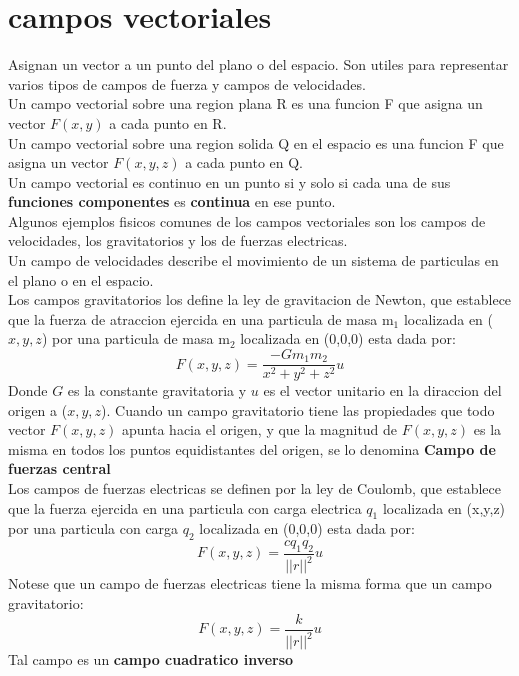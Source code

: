 \documentclass[11pt]{article}
\begin{document}
\section{campos vectoriales}
Asignan un vector a un punto del plano o del espacio. Son utiles para representar varios tipos de campos de fuerza y campos de velocidades.\\
\linebreak
Un campo vectorial sobre una region plana R es una funcion F que asigna un vector $F(x,y)$ a cada punto en R.\\
\linebreak
Un campo vectorial sobre una region solida Q en el espacio es una funcion F que asigna un vector $F(x,y,z)$ a cada punto en Q.\\
\linebreak
Un campo vectorial es continuo en un punto si y solo si cada una de sus \textbf{funciones componentes} es \textbf{continua} en ese punto.\\
\linebreak
Algunos ejemplos fisicos comunes de los campos vectoriales son los campos de velocidades, los gravitatorios y los de fuerzas electricas.\\
\linebreak
Un campo de velocidades describe el movimiento de un sistema de particulas en el plano o en el espacio.\\
\linebreak
Los campos gravitatorios los define la ley de gravitacion de Newton, que establece que la fuerza de atraccion ejercida en una particula de masa m$_1$ localizada en ($x, y, z$) por una particula de masa m$_2$ localizada en (0,0,0) esta dada por:
\begin{equation*}
	F(x,y,z) = \dfrac{-Gm_1m_2}{x^2+y^2+z^2}u
\end{equation*}
Donde $G$ es la constante gravitatoria y $u$ es el vector unitario en la diraccion del origen a ($x,y,z$). Cuando un campo gravitatorio tiene las propiedades que todo vector $F(x,y,z)$ apunta hacia el origen, y que la magnitud de $F(x,y,z)$ es la misma en todos los puntos equidistantes del origen, se lo denomina \textbf{Campo de fuerzas central}\\
\linebreak
Los campos de fuerzas electricas se definen por la ley de Coulomb, que establece que la fuerza ejercida en una particula con carga electrica $q_1$ localizada en (x,y,z) por una particula con carga $q_2$ localizada en (0,0,0) esta dada por:
\begin{equation*}
	F(x,y,z) = \dfrac{cq_1q_2}{||r||^2}u
\end{equation*}
Notese que un campo de fuerzas electricas tiene la misma forma que un campo gravitatorio:
\begin{equation*}
F(x,y,z) = \dfrac{k}{||r||^2}u
\end{equation*}
Tal campo es un \textbf{campo cuadratico inverso}
\end{document}
